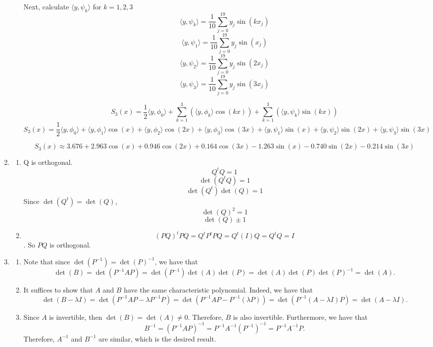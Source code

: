 \documentclass[12pt]{article}
\begin{document}
\begin{enumerate}[leftmargin=0em]
\begin{enumerate}[leftmargin=!]
        Next, calculate \(\langle y,\psi _{k}\rangle \) for \(k=1,2,3\)
        \[\langle y,\psi _{k}\rangle =\frac{1}{10}\sum _{j=0}^{19}y_{j}\sin (kx_{j})\]
        \[\langle y,\psi _{1}\rangle =\frac{1}{10}\sum _{j=0}^{19}y_{j}\sin (x_{j})\]
        \[\langle y,\psi _{2}\rangle =\frac{1}{10}\sum _{j=0}^{19}y_{j}\sin (2x_{j})\]
        \[\langle y,\psi _{3}\rangle =\frac{1}{10}\sum _{j=0}^{19}y_{j}\sin (3x_{j})\]

        \[S_{3}(x)=\frac{1}{2}\langle y,\phi _{0}\rangle +\sum _{k=1}^{3}(\langle y,\phi _{k}\rangle \cos (kx))+\sum _{k=1}^{3}(\langle y,\psi _{k}\rangle \sin (kx))\]
        \[S_{3}(x)=\frac{1}{2}\langle y,\phi _{0}\rangle +\langle y,\phi _{1}\rangle \cos (x)+\langle y,\phi _{2}\rangle \cos (2x)+\langle y,\phi _{3}\rangle \cos (3x)+\langle y,\psi _{1}\rangle \sin (x)+\langle y,\psi _{2}\rangle \sin (2x)+\langle y,\psi _{3}\rangle \sin (3x)\]
        
        \[S_{3}(x)\approx 3.676+2.963\cos (x)+0.946\cos (2x)+0.164\cos (3x)-1.263\sin (x)-0.740\sin (2x)-0.214\sin (3x)\]
        
    \end{enumerate} 

    \item
    \begin{enumerate}[leftmargin=!]
        \item Q is orthogonal.
        \[ Q^{t}Q=1\]
        \[\det(Q^tQ) = 1\]
        \[\det(Q^t)\det(Q)=1\]
        Since $\det(Q^t) = \det(Q)$,
        \[\det(Q)^2 = 1\]
        \[\det(Q)\pm 1\]
        \item
        \[(PQ)^tPQ = Q^tP^tPQ = Q^t(I)Q = Q^tQ=I\].
        So $PQ$ is orthogonal.
    \end{enumerate}

    \item
    \begin{enumerate}[leftmargin=!]
        \item 
        Note that since $\det(P^{-1}) = \det(P)^{-1}$, we have that
        \[\det(B) = \det(P^{-1}AP) = \det(P^{-1})\det(A)\det(P) = \det(A)\det(P)\det(P)^{-1} = \det(A).\]
        \item 
        It suffices to show that $A$ and $B$ have the same characteristic polynomial. Indeed, we have that 
        \[\det(B-\lambda I) = \det(P^{-1}AP -\lambda P^{-1}P) = \det(P^{-1}AP - P^{-1}(\lambda P)) = \det(P^{-1}(A-\lambda I)P) = \det(A-\lambda I).\]
        \item
        Since $A$ is invertible, then $\det(B) = \det(A) \neq 0$. Therefore, $B$ is also invertible. Furthermore, we have that
        \[B^{-1} = {(P^{-1}AP)}^{-1} = P^{-1} A^{-1} {(P^{-1})}^{-1} = P^{-1} A^{-1} P.\]
        Therefore, $A^{-1}$ and $B^{-1}$ are similar, which is the desired result.


\end{enumerate}
\end{enumerate}
\end{document}
